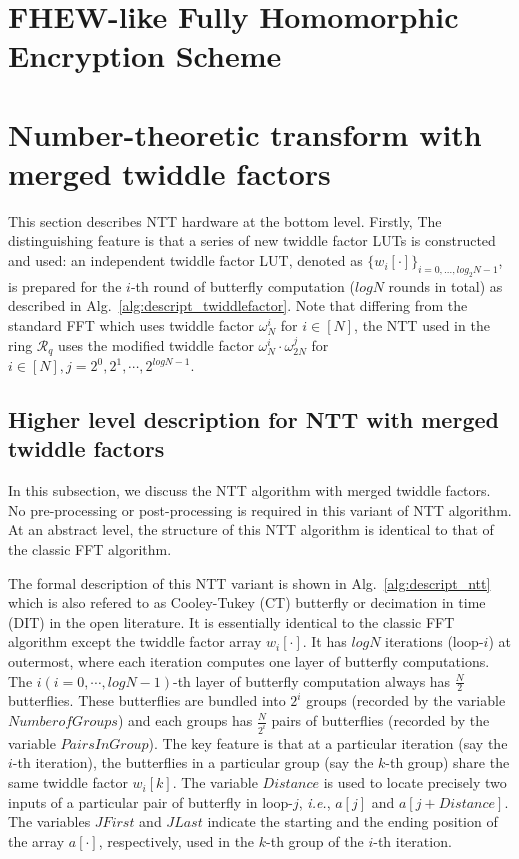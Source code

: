 \documentclass{iacrtrans}
\theoremstyle{plain}
\begin{document}
\section{FHEW-like Fully Homomorphic Encryption Scheme}

\section{Number-theoretic transform with merged twiddle factors}
This section describes NTT hardware at the bottom level. Firstly,  The distinguishing feature is that a series of new twiddle factor LUTs  is constructed and used:  an independent twiddle factor LUT, denoted as $\{w_i[\cdot]\}_{i=0,\ldots,log_2N-1}$, is prepared for the $i$-th round of butterfly computation ($logN$ rounds in total) as described in Alg.~\ref{alg:descript_twiddlefactor}. Note that differing from the standard FFT which uses twiddle factor $\omega_{N}^i$ for $i\in [N]$, the NTT used in the ring $\mathcal{R}_q$ uses the modified twiddle factor $\omega_N^i\cdot\omega_{2N}^j$ for $i\in [N], j=2^0,2^1,\cdots,2^{logN-1}$.

\subsection{Higher level description for NTT with merged twiddle factors}\label{sec:gf2m_arith}

In this subsection, we discuss the NTT algorithm with merged twiddle factors. No pre-processing or post-processing is required in this variant of NTT algorithm. At an abstract level, the structure of this NTT algorithm is identical to that of the classic FFT algorithm. 


The formal description of this NTT variant is shown in Alg.~\ref{alg:descript_ntt} which is also refered to as Cooley-Tukey (CT) butterfly or decimation in time (DIT) in the open literature. It is essentially identical to the classic FFT algorithm except the twiddle factor array $w_i[\cdot]$. It has $logN$ iterations (loop-$i$) at outermost, where each iteration computes one layer of butterfly computations.  The $i(i=0,\cdots,logN-1)$-th layer of butterfly computation always has $\frac{N}{2}$ butterflies. These butterflies are bundled into $2^i$ groups (recorded by the variable $NumberofGroups$) and each groups has $\frac{N}{2^i}$ pairs of butterflies (recorded by the variable $PairsInGroup$). The key feature is that at a particular iteration (say the $i$-th iteration), the butterflies in a particular group (say the $k$-th group) share the same twiddle factor $w_i[k]$. The variable $Distance$ is used to locate precisely two inputs of a particular pair of butterfly in loop-$j$, \textit{i.e.}, $a[j]$ and $a[j+Distance]$. The variables $JFirst$ and $JLast$ indicate the starting and the ending position of the array $a[\cdot]$, respectively, used in the $k$-th group of the $i$-th iteration.
\end{document}
